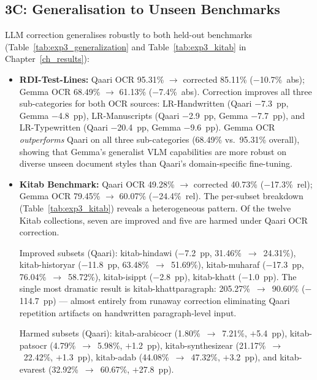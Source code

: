 \subsection*{3C: Generalisation to Unseen Benchmarks}

LLM correction generalises robustly to both held-out benchmarks
(Table~\ref{tab:exp3_generalization} and Table~\ref{tab:exp3_kitab} in
Chapter~\ref{ch_results}):

\begin{itemize}
  \item \textbf{RDI-Test-Lines:} Qaari OCR 95.31\% $\to$ corrected 85.11\%
        ($-$10.7\%~abs); Gemma OCR 68.49\% $\to$ 61.13\% ($-$7.4\%~abs).
        Correction improves all three sub-categories for both OCR sources:
        LR-Handwritten (Qaari $-$7.3~pp, Gemma $-$4.8~pp),
        LR-Manuscripts (Qaari $-$2.9~pp, Gemma $-$7.7~pp), and
        LR-Typewritten (Qaari $-$20.4~pp, Gemma $-$9.6~pp).
        Gemma OCR \emph{outperforms} Qaari on all three sub-categories
        (68.49\% vs.\ 95.31\% overall), showing that Gemma's generalist
        VLM capabilities are more robust on diverse unseen document styles
        than Qaari's domain-specific fine-tuning.

  \item \textbf{Kitab Benchmark:} Qaari OCR 49.28\% $\to$ corrected 40.73\%
        ($-$17.3\%~rel); Gemma OCR 79.45\% $\to$ 60.07\% ($-$24.4\%~rel).
        The per-subset breakdown (Table~\ref{tab:exp3_kitab}) reveals a
        heterogeneous pattern. Of the twelve Kitab collections, seven are
        improved and five are harmed under Qaari OCR correction.

        Improved subsets (Qaari): kitab-hindawi ($-$7.2~pp,
        31.46\%~$\to$~24.31\%), kitab-historyar ($-$11.8~pp,
        63.48\%~$\to$~51.69\%), kitab-muharaf ($-$17.3~pp,
        76.04\%~$\to$~58.72\%), kitab-isippt ($-$2.8~pp),
        kitab-khatt ($-$1.0~pp). The single most dramatic result is
        kitab-khattparagraph: 205.27\%~$\to$~90.60\% ($-$114.7~pp) ---
        almost entirely from runaway correction eliminating Qaari repetition
        artifacts on handwritten paragraph-level input.

        Harmed subsets (Qaari): kitab-arabicocr (1.80\%~$\to$~7.21\%,
        $+$5.4~pp), kitab-patsocr (4.79\%~$\to$~5.98\%, $+$1.2~pp),
        kitab-synthesizear (21.17\%~$\to$~22.42\%, $+$1.3~pp),
        kitab-adab (44.08\%~$\to$~47.32\%, $+$3.2~pp), and
        kitab-evarest (32.92\%~$\to$~60.67\%, $+$27.8~pp).
\end{itemize}

